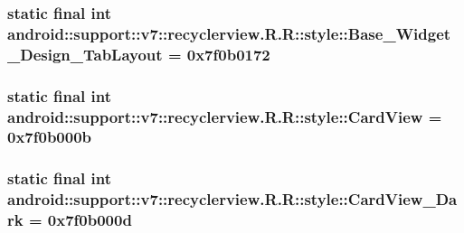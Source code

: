 \hypertarget{classandroid_1_1support_1_1v7_1_1recyclerview_1_1_r_1_1style_4ea4327f4e8f33699c7da9498c579196}{
\subsubsection[{Base\_\-Widget\_\-Design\_\-TabLayout}]{\setlength{\rightskip}{0pt plus 5cm}static final int android::support::v7::recyclerview.R.R::style::Base\_\-Widget\_\-Design\_\-TabLayout = 0x7f0b0172}}
\label{classandroid_1_1support_1_1v7_1_1recyclerview_1_1_r_1_1style_4ea4327f4e8f33699c7da9498c579196}


\hypertarget{classandroid_1_1support_1_1v7_1_1recyclerview_1_1_r_1_1style_dec1ba0d4a4e55b870332a4c264bae66}{
\subsubsection[{CardView}]{\setlength{\rightskip}{0pt plus 5cm}static final int android::support::v7::recyclerview.R.R::style::CardView = 0x7f0b000b}}
\label{classandroid_1_1support_1_1v7_1_1recyclerview_1_1_r_1_1style_dec1ba0d4a4e55b870332a4c264bae66}


\hypertarget{classandroid_1_1support_1_1v7_1_1recyclerview_1_1_r_1_1style_1cf52b635876c60bb512e173ee13609b}{
\subsubsection[{CardView\_\-Dark}]{\setlength{\rightskip}{0pt plus 5cm}static final int android::support::v7::recyclerview.R.R::style::CardView\_\-Dark = 0x7f0b000d}}
\label{classandroid_1_1support_1_1v7_1_1recyclerview_1_1_r_1_1style_1cf52b635876c60bb512e173ee13609b}


